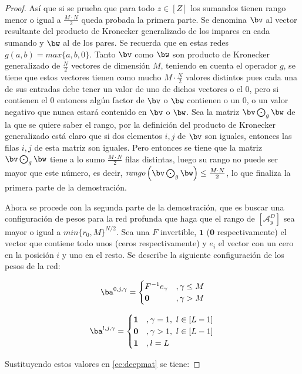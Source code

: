 \begin{proof}
Así que si se prueba que para todo $z\in [Z]$ los sumandos tienen rango menor o igual a $\frac{M\cdot N}{2}$ queda probada la primera parte. Se denomina $\bv$ al vector resultante del producto de Kronecker generalizado de los impares en cada sumando y $\bw$ al de los pares. Se recuerda que en estas redes $g(a,b)=\textit{max}\{a,b,0\}$. Tanto $\bv$ como $\bw$ son producto de Kronecker generalizado de $\frac{N}{2}$ vectores de dimensión $M$, teniendo en cuenta el operador $g$, se tiene que estos vectores tienen como mucho $M\cdot \frac{N}{2}$ valores distintos pues cada una de sus entradas debe tener un valor de uno de dichos vectores o el $0$, pero si contienen el $0$ entonces algún factor de $\bv$ o $\bw$ contienen o un $0$, o un valor negativo que nunca estará contenido en $\bv$ o $\bw$. Sea la matriz $\bv \bigodot_g \bw$ de la que se quiere saber el rango, por la definición del producto de Kronecker generalizado está claro que si dos elementos $i,j$ de $\bv$ son iguales, entonces las filas $i,j$ de esta matriz son iguales. Pero entonces se tiene que la matriz $\bv \bigodot_g \bw$ tiene a lo sumo $\frac{M\cdot N}{2}$ filas distintas, luego su rango no puede ser mayor que este número, es decir, $\textit{rango}\left(\bv \bigodot_g \bw\right) \leq \frac{M\cdot N}{2}$, lo que finaliza la primera parte de la demostración.

Ahora se procede con la segunda parte de la demostración, que es buscar una configuración de pesos para la red profunda que haga que el rango de $[\mathcal{A}^D_y]$ sea mayor o igual a $\textit{min}\{r_0,M\}^{N/2}$. Sea una $F$ invertible, $\mathbf{1}$ ($\mathbf{0}$ respectivamente) el vector que contiene todo unos (ceros respectivamente) y $e_i$ el vector con un cero en la posición $i$ y uno en el resto. Se describe la siguiente configuración de los pesos de la red:

$$
\ba^{0,j,\gamma} = \begin{cases}
F^{-1}e_\gamma  &,\gamma \leq M \\
\mathbf{0}  &, \gamma > M
\end{cases} $$

$$
\ba^{l,j,\gamma} = \begin{cases}
\mathbf{1}  &,\gamma =1, \ l \in [L-1] \\
\mathbf{0}  &, \gamma > 1, \ l \in [L-1] \\
\mathbf{1}  &, l = L
\end{cases} \\
$$

Sustituyendo estos valores en \eqref{ec:deepmat} se tiene:


\end{proof}
